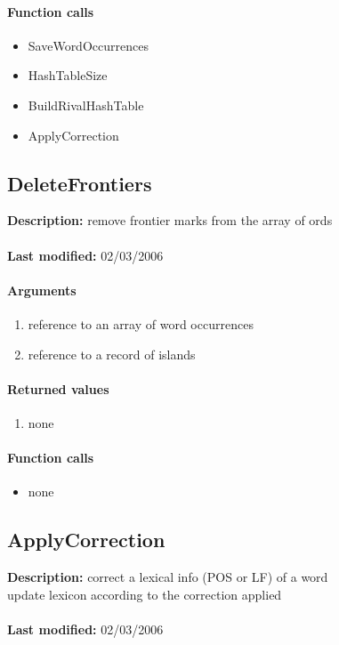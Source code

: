 \paragraph{Function calls}
\begin{itemize}
\item SaveWordOccurrences
\item HashTableSize
\item BuildRivalHashTable
\item ApplyCorrection
\end{itemize}

\subsection{DeleteFrontiers}
\textbf{Description:} remove frontier marks from the array of ords\\
\\\textbf{Last modified:} 02/03/2006

\paragraph{Arguments}
\begin{enumerate}
\item reference to an array of word occurrences
\item reference to a record of islands
\end{enumerate}

\paragraph{Returned values}
\begin{enumerate}
\item none
\end{enumerate}

\paragraph{Function calls}
\begin{itemize}
\item none
\end{itemize}

\subsection{ApplyCorrection}
\textbf{Description:} correct a lexical info (POS or LF) of a word\\
update lexicon according to the correction applied\\
\\\textbf{Last modified:} 02/03/2006


